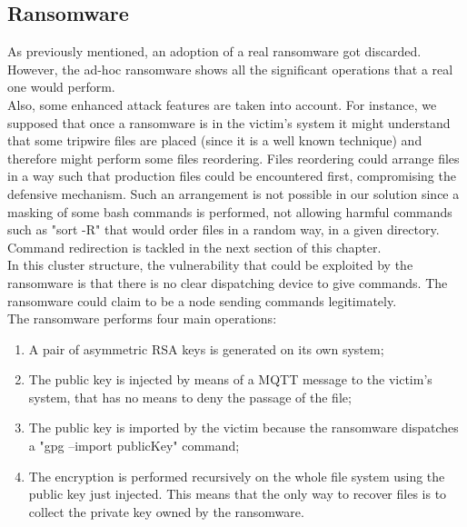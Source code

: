 \subsection{Ransomware}

As previously mentioned, an adoption of a real ransomware got discarded. However, the ad-hoc ransomware shows all the significant operations that a real one would perform.\\
Also, some enhanced attack features are taken into account. For instance, we supposed that once a ransomware is in the victim's system it might understand that some tripwire files are placed (since it is a well known technique) and therefore might perform some files reordering. Files reordering could arrange files in a way such that production files could be encountered first, compromising the defensive mechanism. Such an arrangement is not possible in our solution since a masking of some bash commands is performed, not allowing harmful commands such as "sort -R" that would order files in a random way, in a given directory. Command redirection is tackled in the next section of this chapter.\\
In this cluster structure, the vulnerability that could be exploited by the ransomware is that there is no clear dispatching device to give commands. The ransomware could claim to be a node sending commands legitimately.\\
The ransomware performs four main operations:

\begin{enumerate}
  \item A pair of asymmetric RSA keys is generated on its own system;
  \item The public key is injected by means of a MQTT message to the victim's system, that has no means to deny the passage of the file;
  \item The public key is imported by the victim because the ransomware dispatches a "gpg --import publicKey" command;
  \item The encryption is performed recursively on the whole file system using the public key just injected. This means that the only way to recover files is to collect the private key owned by the ransomware.
\end{enumerate}



